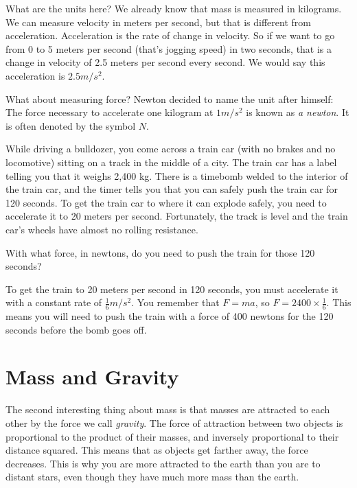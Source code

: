 What are the units here? We already know that mass is measured in
kilograms. We can measure velocity in meters per second, but that is
different from acceleration. Acceleration is the rate of change in
velocity. So if we want to go from 0 to 5 meters per second (that's
jogging speed) in two seconds, that is a change in velocity of 2.5
meters per second every second. We would say this acceleration is $2.5
m/s^2$.

What about measuring force? Newton decided to name the unit after
himself: The force necessary to accelerate one kilogram at $1 m/s^2$
is known as \textit{a newton}. It is often denoted by the symbol $N$.

\begin{Exercise}[title={Acceleration}, label=acceleration_train]

While driving a bulldozer, you come across a train car (with no brakes
and no locomotive) sitting on a track in the middle of a city. The train car
has a label telling you that it weighs 2,400 kg. There is a timebomb
welded to the interior of the train car, and the timer tells you that
you can safely push the train car for 120 seconds. To get the train
car to where it can explode safely, you need to accelerate it to 20 meters per
second. Fortunately, the track is level and the train car's wheels have
almost no rolling resistance.

With what force, in newtons, do you need to push the train for those 120 seconds?

\end{Exercise}
\begin{Answer}[ref=acceleration_train]
To get the train to 20 meters per second in 120 seconds, you must
accelerate it with a constant rate of $\frac{1}{6} m/s^2$. You
remember that $F = m a$, so $F = 2400 \times \frac{1}{6}$. This means you
will need to push the train with a force of 400 newtons for the 120 seconds
before the bomb goes off.
\end{Answer}

\section{Mass and Gravity}

The second interesting thing about mass is that masses are
attracted to each other by the force we call \textit{gravity}. The
force of attraction between two objects is proportional to the product
of their masses, and inversely proportional to their distance squared.
This means that as objects get farther away, the force decreases.
This is why you are more attracted to the earth than you are to
distant stars, even though they have much more mass than the earth.

